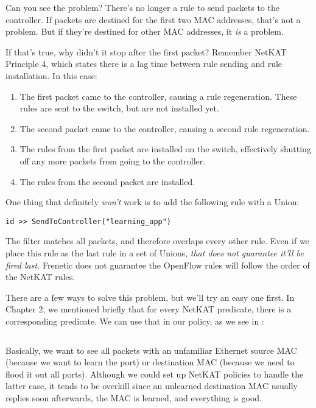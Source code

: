 Can you see the problem?  There's no longer a rule to send packets to the controller.  If packets
are destined for the first two MAC addresses, that's not a problem.  But if they're destined for
other MAC addresses, it \emph{is} a problem.

If that's true, why didn't it stop after the first packet?  Remember NetKAT Principle 4, which 
states there is a lag time between rule sending and rule installation.  In this case:

\begin{enumerate}
\item The first packet came to the controller, causing a rule regeneration.  These rules
are sent to the switch, but are not installed yet.
\item The second packet came to the controller, causing a second rule regeneration.
\item The rules from the first packet are installed on the switch, effectively shutting off 
any more packets from going to the controller.
\item The rules from the second packet are installed.  
\end{enumerate}

One thing that definitely \emph{won't} work is to add the following rule with a Union:

\begin{verbatim}
id >> SendToController("learning_app")
\end{verbatim}

The  filter matches all packets, and therefore overlaps every other rule.  Even if we place this
rule as the last rule in a set of Unions, \emph{that does not guarantee it'll be fired last.}  Frenetic 
does not guarantee the OpenFlow rules will follow the order of the NetKAT rules.     

There are a few ways to solve this problem, but we'll try an easy one first.  
In Chapter 2, we mentioned briefly that for every  NetKAT predicate, there is a corresponding
 predicate.  We can use that in our policy, as we see in :

\inputminted[firstline=30,lastline=37]{python}{code/l2_learning_switch/learning3.py}

Basically, we want to see all packets with an unfamiliar Ethernet source MAC (because we want to learn the
port) or destination MAC (because we need to flood it out all ports).  Although we could set up 
NetKAT policies to handle the latter case, it tends to be overkill since an unlearned destination MAC
usually replies soon afterwards, the MAC is learned, and everything is good.  

